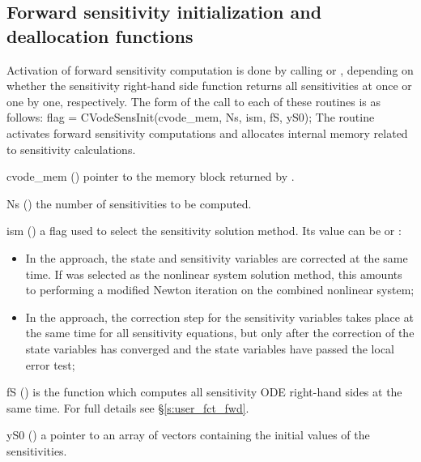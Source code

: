 \subsection{Forward sensitivity initialization and deallocation functions}
\label{ss:sensi_malloc}
Activation of forward sensitivity computation is done by calling
 or , depending on whether the sensitivity
right-hand side function returns all sensitivities at once or one by one, respectively.
The form of the call to each of these routines is as follows:
{
  flag = CVodeSensInit(cvode\_mem, Ns, ism, fS, yS0);
}
{
  The routine  activates forward sensitivity computations and
  allocates internal memory related to sensitivity calculations.
}
{
  \begin{args}

  \item[cvode\_mem] ()
    pointer to the {\cvodes} memory block returned by .

  \item[Ns] () 
    the number of sensitivities to be computed.

  \item[ism] ()
    a flag used to select the sensitivity solution method.  Its value can be
     or :
    \begin{itemize}
    \item In the  approach, the state and sensitivity variables are
      corrected at the same time. If  was selected as the nonlinear system 
      solution method, this amounts to performing a modified Newton iteration on the
      combined nonlinear system;
    \item In the  approach, the correction step for the sensitivity
      variables takes place at the same time for all sensitivity equations, but only after 
      the correction of the state variables has converged and the state variables 
      have passed the local error test; 
    \end{itemize}

  \item[fS] ()
    is the {\CC} function which computes all sensitivity ODE right-hand sides at the same time.
    For full details see \S\ref{s:user_fct_fwd}.

  \item[yS0] () 
    a pointer to an array of  vectors containing the initial 
    values of the sensitivities.

  \end{args}
}
